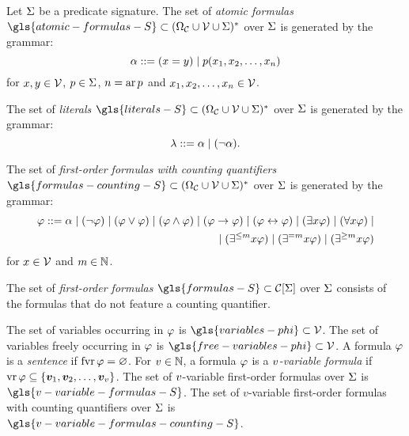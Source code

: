 
Let $\mathrm{\Sigma}$ be a predicate signature.
The set of \emph{atomic formulas} $\gls{atomic-formulas-S} \subset
\Words{(\SymbAlph \cup \VarSymbs \cup \sigS)}$ over $\mathrm{\Sigma}$ is generated by the
grammar:
\[
  \alpha ::= (x = y) \mid p(x_{1}, x_{2}, \dots, x_{n})
\]
for $x,y \in \mathcal{V}$, $p \in \mathrm{\Sigma}$, $n = \operatorname{ar}p$ and
$x_{1}, x_{2}, \dots, x_{n} \in \mathcal{V}$.

The set of \emph{literals} 
$\gls{literals-S} \subset \Words{(\SymbAlph \cup \VarSymbs \cup \sigS)}$ over
$\mathrm{\Sigma}$ is generated by the grammar:
\[
  \lambda ::= \alpha \mid (\lnot\alpha).
\]

The set of \emph{first-order formulas with counting quantifiers}
$\gls{formulas-counting-S} \subset \Words{(\SymbAlph \cup \VarSymbs \cup
\sigS)}$ over $\mathrm{\Sigma}$ is generated by the grammar:
\begin{align*}
  \varphi ::= \alpha \mid (\lnot\varphi) \mid (\varphi \lor \varphi)
  \mid (\varphi \land \varphi) \mid (\varphi \rightarrow \varphi) 
  \mid (\varphi \leftrightarrow \varphi) 
  \mid (\exists x\varphi) \mid (\forall x\varphi) \mid \\
  \mid (\exists^{\leq m}x\varphi)
  \mid (\exists^{=m}x\varphi)
  \mid (\exists^{\geq m}x\varphi)
\end{align*}
for $x \in \mathcal{V}$ and $m \in \mathbb{N}$.

The set of \emph{first-order formulas} $\gls{formulas-S} \subset \FocF\sigS$
over $\mathrm{\Sigma}$ consists of the formulas that do not feature a counting quantifier.

The set of variables occurring in $\varphi$ is $\gls{variables-phi} \subset
\VarSymbs$.
The set of variables freely occurring in $\varphi$ is $\gls{free-variables-phi}
\subset \VarSymbs$. A formula $\varphi$ is a \emph{sentence} if $\operatorname{fvr}\varphi =
\varnothing$. For $v \in \mathbb{N}$, a formula $\varphi$ is a \emph{$v$-variable
formula} if $\operatorname{vr}\varphi \subseteq \left\{\bm{v}_{1},\bm{v}_{2},\dots,\bm{v}_{v}\right\}$.
The set of $v$-variable first-order formulas over $\mathrm{\Sigma}$ is
$\gls{v-variable-formulas-S}$.
The set of $v$-variable first-order formulas with counting quantifiers over
$\mathrm{\Sigma}$ is $\gls{v-variable-formulas-counting-S}$.